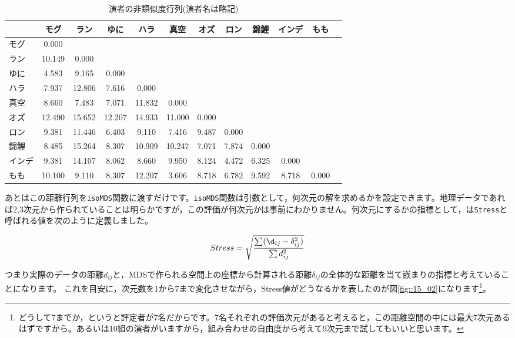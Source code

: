\documentclass{ltjsbook}
\begin{document}
\begin{table}[ht]
    \centering
    \caption{演者の非類似度行列(演者名は略記)}
    \begin{tabular}{l|ccccccccccc}
        \hline
               & モグ   & ラン   & ゆに   & ハラ   & 真空   & オズ  & ロン  & 錦鯉  & インデ & もも  \\
        \hline
        モグ   & 0.000  &        &        &        &        &       &       &       &        &       \\
        ラン   & 10.149 & 0.000  &        &        &        &       &       &       &        &       \\
        ゆに   & 4.583  & 9.165  & 0.000  &        &        &       &       &       &        &       \\
        ハラ   & 7.937  & 12.806 & 7.616  & 0.000  &        &       &       &       &        &       \\
        真空   & 8.660  & 7.483  & 7.071  & 11.832 & 0.000  &       &       &       &        &       \\
        オズ   & 12.490 & 15.652 & 12.207 & 14.933 & 11.000 & 0.000 &       &       &        &       \\
        ロン   & 9.381  & 11.446 & 6.403  & 9.110  & 7.416  & 9.487 & 0.000 &       &        &       \\
        錦鯉   & 8.485  & 15.264 & 8.307  & 10.909 & 10.247 & 7.071 & 7.874 & 0.000 &        &       \\
        インデ & 9.381  & 14.107 & 8.062  & 8.660  & 9.950  & 8.124 & 4.472 & 6.325 & 0.000  &       \\
        もも   & 10.100 & 9.110  & 8.307  & 12.207 & 3.606  & 8.718 & 6.782 & 9.592 & 8.718  & 0.000 \\
        \hline
    \end{tabular}
    \label{tbl:x15_distMat}
\end{table}
あとはこの距離行列を\verb|isoMDS|関数に渡すだけです。\verb|isoMDS|関数は引数として，何次元の解を求めるかを設定できます。地理データであれば2,3次元から作られていることは明らかですが，この評価が何次元かは事前にわかりません。何次元にするかの指標として，\citet{kruskal1964}は\verb|Stress|と呼ばれる値を次のように定義しました。

\[ Stress = \sqrt{\frac{\sum(\d_{ij} - \delta_{ij}^2)}{\sum d_{ij}^2}} \]

つまり実際のデータの距離$d_{ij}$と，MDSで作られる空間上の座標から計算される距離$\delta_{ij}$の全体的な距離を当て嵌まりの指標と考えていることになります。
これを目安に，次元数を1から7まで変化させながら，Stress値がどうなるかを表したのが図\ref{fig::15_02}になります\footnote{どうして7までか，というと評定者が7名だからです。7名それぞれの評価次元があると考えると，この距離空間の中には最大7次元あるはずですから。あるいは10組の演者がいますから，組み合わせの自由度から考えて9次元まで試してもいいと思います。}。
\end{document}
